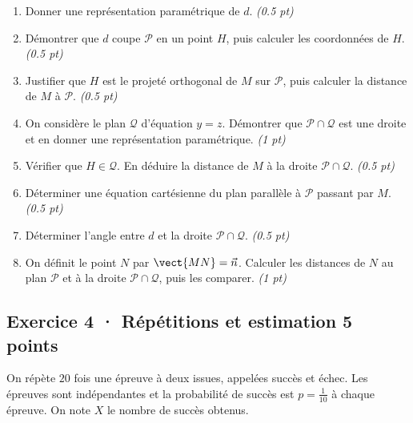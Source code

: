 \begin{enumerate}

\item Donner une représentation paramétrique de $d$. \hfill\textit{(\num{0,5} pt)}

\item Démontrer que $d$ coupe $\mathcal P$ en un point $H$, puis calculer les coordonnées de $H$. \hfill\textit{(\num{0,5} pt)}

\item Justifier que $H$ est le projeté orthogonal de $M$ sur $\mathcal P$, puis calculer la distance de $M$ à $\mathcal P$. \hfill\textit{(\num{0,5} pt)}

\item On considère le plan $\mathcal Q$ d'équation $y=z$. Démontrer que $\mathcal P\cap\mathcal Q$ est une droite et en donner une représentation paramétrique. \hfill\textit{(1 pt)}

\item Vérifier que $H\in\mathcal Q$. En déduire la distance de $M$ à la droite $\mathcal P\cap\mathcal Q$. \hfill\textit{(\num{0,5} pt)}

\item Déterminer une équation cartésienne du plan parallèle à $\mathcal P$ passant par $M$. \hfill\textit{(\num{0,5} pt)}

\item Déterminer l'angle entre $d$ et la droite $\mathcal P\cap\mathcal Q$. \hfill\textit{(\num{0,5} pt)}

\item On définit le point $N$ par $\vect{MN}=\vec n$. Calculer les distances de $N$ au plan $\mathcal P$ et à la droite $\mathcal P\cap\mathcal Q$, puis les comparer. \hfill\textit{(1 pt)}

\end{enumerate}

\subsection*{Exercice 4 · Répétitions et estimation \hfill 5 points}On répète $20$ fois une épreuve à deux issues, appelées succès et échec. Les épreuves sont indépendantes et la probabilité de succès est $p=\frac{1}{10}$ à chaque épreuve. On note $X$ le nombre de succès obtenus.

